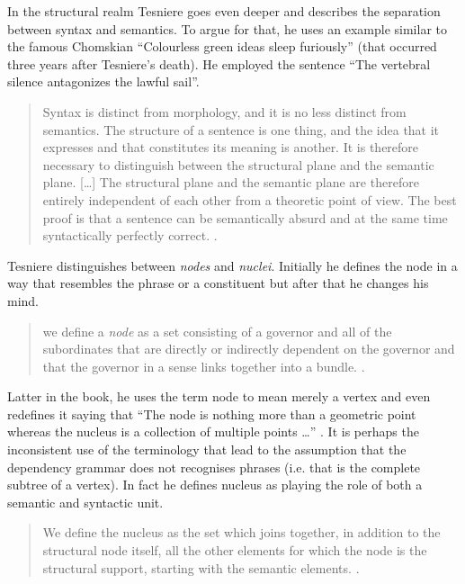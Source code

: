 In the structural realm Tesniere goes even deeper and describes the separation between syntax and semantics. To argue for that, he uses an example similar to the famous Chomskian ``Colourless green ideas sleep furiously'' \citep{Chomsky57} (that occurred three years after Tesniere's death). He employed the sentence ``The vertebral silence antagonizes the lawful sail''.

\begin{quotation}
    Syntax is distinct from morphology, and it is no less distinct from semantics. The structure of a sentence is one thing, and the idea that it expresses and that constitutes its meaning is another. It is therefore necessary to distinguish between the structural plane and the semantic plane.
    [\dots]
    The structural plane and the semantic plane are therefore entirely independent of each other from a theoretic point of view. The best proof is that a sentence can be ­semantically absurd and at the same time syntactically perfectly correct. \citep[33]{Tesniere2015}.
\end{quotation}

Tesniere distinguishes between \textit{nodes} and \textit{nuclei}. Initially he defines the node in a way that resembles the phrase or a constituent but after that he changes his mind.  

\begin{quotation}
    we define a \textit{node} as a set consisting of a governor and all of the subordinates that are directly or indirectly dependent on the governor and that the governor in a sense links together into a bundle. \citep[6]{Tesniere2015}.
\end{quotation}

Latter in the book, he uses the term node to mean merely a vertex and even redefines it saying that ``The node is nothing more than a geometric point whereas the nucleus is a collection of multiple points \dots'' \cite[39]{Tesniere2015}. It is perhaps the inconsistent use of the terminology that lead to the assumption that the dependency grammar does not recognises phrases (i.e. that is the complete subtree of a vertex). In fact he defines nucleus as playing the role of both a semantic and syntactic unit.

\begin{quotation}
    We define the nucleus as the set which joins together, in addition to the structural node itself, all the other elements for which the node is the structural support, starting with the semantic elements. \citep[38]{Tesniere2015}.
\end{quotation}

